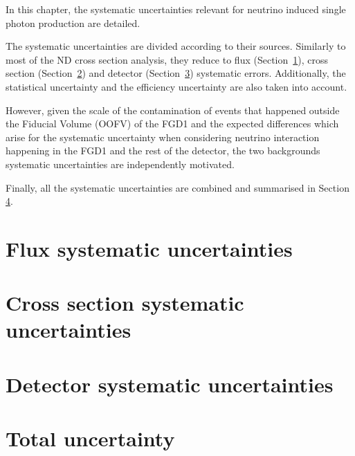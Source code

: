 In this chapter, the systematic uncertainties relevant for neutrino
induced single photon production are detailed.

The systematic uncertainties are divided according to their
sources. Similarly to most of the \Gls{ND} cross section analysis,
they reduce to flux (Section~\ref{sec:fluxsyst}), cross section
(Section~\ref{sec:xsecsyst}) and detector (Section~\ref{sec:detsyst})
systematic errors. Additionally, the statistical uncertainty and the
efficiency uncertainty are also taken into account.

However, given the scale of the contamination of events that happened
outside the Fiducial Volume (\Gls{OOFV}) of the \Gls{FGD}1 and the
expected differences which arise for the systematic uncertainty when
considering neutrino interaction happening in the \Gls{FGD}1 and the
rest of the detector, the two backgrounds systematic uncertainties are
independently motivated.

Finally, all the systematic uncertainties are combined and summarised
in Section \ref{sec:totaluncertainty}.

\clearpage

\section{Flux systematic uncertainties}
\label{sec:fluxsyst}

\clearpage

\section{Cross section systematic uncertainties}
\label{sec:xsecsyst}

\clearpage

\section{Detector systematic uncertainties}
\label{sec:detsyst}

\clearpage

\section{Total uncertainty}
\label{sec:totaluncertainty}

\clearpage


